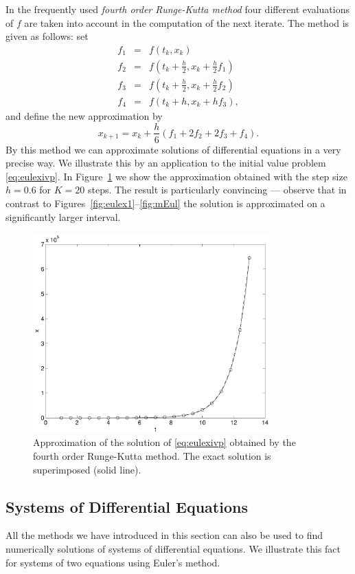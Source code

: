 \documentclass{ximera}
\begin{document}
In the frequently used {\em fourth order Runge-Kutta method\/} four 
different evaluations of $f$ are taken into account in the computation of 
the next iterate.  The method is given as follows: set
\begin{eqnarray*}
f_1 &=& f(t_k,x_k)\\
f_2 &=& f\left(t_k+\frac{h}{2},x_k+\frac{h}{2}f_1\right)\\
f_3 &=& f\left(t_k+\frac{h}{2},x_k+\frac{h}{2}f_2\right)\\
f_4 &=& f(t_k+h,x_k+hf_3),
\end{eqnarray*}
and define the new approximation by
\[
x_{k+1} = x_k+\frac{h}{6}(f_1+2f_2+2f_3+f_4).
\]
By this method we can approximate solutions of differential equations
in a very precise way.  We illustrate this by an application to 
the initial value problem \eqref{eq:eulexivp}.  In Figure~\ref{fig:rk1} we
show the approximation obtained with the step size $h=0.6$ for $K=20$
steps.  The result is particularly convincing --- observe that
in contrast to Figures~\ref{fig:eulex1}--\ref{fig:mEul} the solution is
approximated on a significantly larger interval.
\begin{figure}[htb]
   \centerline{%
   \includegraphics[width=3.6in]{../figures/runkut1.pdf}}
   \caption{Approximation of the solution of
   \protect\eqref{eq:eulexivp} obtained by the fourth order Runge-Kutta
   method.  The exact solution is superimposed (solid line).}
   \label{fig:rk1}
\end{figure}

\subsection*{Systems of Differential Equations}

All the methods we have introduced in this section can
also be used to find numerically solutions of systems 
of differential equations.  We illustrate this fact for
systems of two equations using Euler's method.
\end{document}
